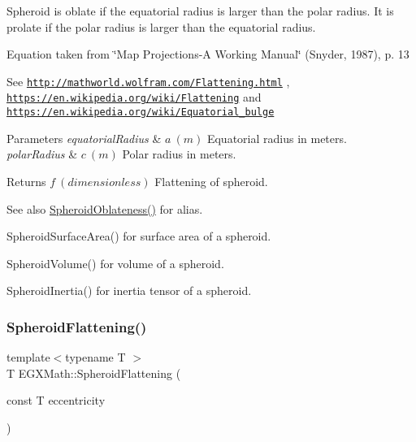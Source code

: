 Spheroid is oblate if the equatorial radius is larger than the polar radius. It is prolate if the polar radius is larger than the equatorial radius.

Equation taken from \char`\"{}\+Map Projections-\/\+A Working Manual\char`\"{} (Snyder, 1987), p. 13

See \href{http://mathworld.wolfram.com/Flattening.html}{\tt http\+://mathworld.\+wolfram.\+com/\+Flattening.\+html} , \href{https://en.wikipedia.org/wiki/Flattening}{\tt https\+://en.\+wikipedia.\+org/wiki/\+Flattening} and \href{https://en.wikipedia.org/wiki/Equatorial_bulge}{\tt https\+://en.\+wikipedia.\+org/wiki/\+Equatorial\+\_\+bulge} 
\begin{DoxyParams}{Parameters}
{\em equatorial\+Radius} & $ a\ (m)$ Equatorial radius in meters. \\
\hline
{\em polar\+Radius} & $ c\ (m)$ Polar radius in meters. \\
\hline
\end{DoxyParams}
\begin{DoxyReturn}{Returns}
$ f\ (dimensionless)$ Flattening of spheroid. 
\end{DoxyReturn}
\begin{DoxySeeAlso}{See also}
\mbox{\hyperlink{group___e_g_x_math-_geometry-3_d-_spheroid-_flattening_ga486adfc58b047197daf87f50b2039ca7}{Spheroid\+Oblateness()}} for alias. 

Spheroid\+Surface\+Area() for surface area of a spheroid. 

Spheroid\+Volume() for volume of a spheroid. 

Spheroid\+Inertia() for inertia tensor of a spheroid. 
\end{DoxySeeAlso}
\mbox{\label{group___e_g_x_math-_geometry-3_d-_spheroid-_flattening_ga9822b6e1025edbf7d272949547c53511}} 
\subsubsection{\texorpdfstring{Spheroid\+Flattening()}{SpheroidFlattening()}\hspace{0.1cm}{\footnotesize\ttfamily [2/2]}}
{\footnotesize\ttfamily template$<$typename T $>$ \\
T E\+G\+X\+Math\+::\+Spheroid\+Flattening (\begin{DoxyParamCaption}\item[{const T}]{eccentricity }\end{DoxyParamCaption})}



